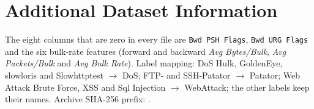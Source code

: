 \documentclass[12pt,a4paper,oneside]{report}
\begin{document}
\section{Additional Dataset Information}
{\sloppy The eight columns that are zero in every file are \texttt{Bwd PSH Flags}, \texttt{Bwd URG Flags} and the six bulk-rate features (forward and backward \emph{Avg Bytes/Bulk}, \emph{Avg Packets/Bulk} and \emph{Avg Bulk Rate}). Label mapping: DoS Hulk, GoldenEye, slowloris and Slowhttptest $\to$ DoS; FTP- and SSH-Patator $\to$ Patator; Web Attack Brute Force, XSS and Sql Injection $\to$ WebAttack; the other labels keep their names. Archive SHA-256 prefix: \texttt{\ArchiveShaShort}.\par}
\end{document}

